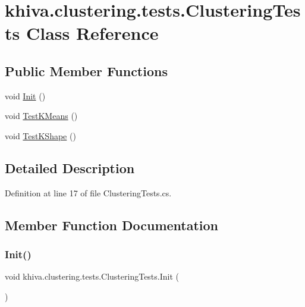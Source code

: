 \hypertarget{classkhiva_1_1clustering_1_1tests_1_1_clustering_tests}{}\section{khiva.\+clustering.\+tests.\+Clustering\+Tests Class Reference}
\label{classkhiva_1_1clustering_1_1tests_1_1_clustering_tests}
\subsection*{Public Member Functions}
\begin{DoxyCompactItemize}
\item 
void \mbox{\hyperlink{classkhiva_1_1clustering_1_1tests_1_1_clustering_tests_a2a7df6c4407ddc028251544baa009698}{Init}} ()
\item 
void \mbox{\hyperlink{classkhiva_1_1clustering_1_1tests_1_1_clustering_tests_a2135ab26c9481d3f04140e74520b6e93}{Test\+K\+Means}} ()
\item 
void \mbox{\hyperlink{classkhiva_1_1clustering_1_1tests_1_1_clustering_tests_a10c280e15c599f833cd9b3b7b006edb9}{Test\+K\+Shape}} ()
\end{DoxyCompactItemize}


\subsection{Detailed Description}


Definition at line 17 of file Clustering\+Tests.\+cs.



\subsection{Member Function Documentation}
\mbox{\label{classkhiva_1_1clustering_1_1tests_1_1_clustering_tests_a2a7df6c4407ddc028251544baa009698}} 
\subsubsection{\texorpdfstring{Init()}{Init()}}
{\footnotesize\ttfamily void khiva.\+clustering.\+tests.\+Clustering\+Tests.\+Init (\begin{DoxyParamCaption}{ }\end{DoxyParamCaption})\hspace{0.3cm}{\ttfamily [inline]}}



